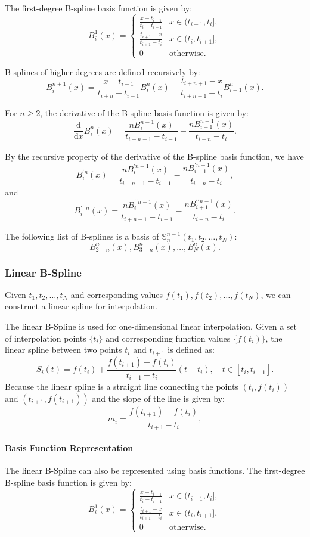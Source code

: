 \documentclass[a4paper]{article}
\begin{document}
\begin{sloppypar}
The first-degree B-spline basis function is given by:
\[ B^1_i(x) = \begin{cases}
\frac{x - t_{i-1}}{t_i - t_{i-1}} & x \in (t_{i-1}, t_i], \\
\frac{t_{i+1} - x}{t_{i+1} - t_i} & x \in (t_i, t_{i+1}], \\
0 & \text{otherwise.}
\end{cases} \]

B-splines of higher degrees are defined recursively by:
\[ B_{i}^{n+1}(x) = \frac{x - t_{i-1}}{t_{i+n} - t_{i-1}} B_{i}^{n}(x) + \frac{t_{i+n+1} - x}{t_{i+n+1} - t_{i}} B_{i+1}^{n}(x). \]


For \( n \geq 2 \), the derivative of the B-spline basis function is given by:
\[ \frac{\mathrm{d}}{\mathrm{d}x} B_{i}^{n}(x) = \frac{n B_{i}^{n-1}(x)}{t_{i+n-1} - t_{i-1}} - \frac{n B_{i+1}^{n-1}(x)}{t_{i+n} - t_{i}}. \]

By the recursive property of the derivative of the B-spline basis function, we have
\[  B_{i}^{\prime n}(x) = \frac{n B_{i}^{\prime n-1}(x)}{t_{i+n-1} - t_{i-1}} - \frac{n B_{i+1}^{\prime n-1}(x)}{t_{i+n} - t_{i}}, \]
and
\[  B_{i}^{\prime \prime \prime n}(x) = \frac{n B_{i}^{\prime \prime n-1}(x)}{t_{i+n-1} - t_{i-1}} - \frac{n B_{i+1}^{\prime \prime n-1}(x)}{t_{i+n} - t_{i}}. \]


The following list of B-splines is a basis of \(\mathbb{S}_{n}^{n-1}(t_{1},t_{2},\ldots,t_{N})\):
\[ B_{2-n}^{n}(x), B_{3-n}^{n}(x), \ldots, B_{N}^{n}(x).  \]

\subsubsection{Linear B-Spline}
Given \( t_1, t_2, \ldots, t_{N} \) and corresponding values \( f(t_1), f(t_2), \ldots, f(t_N) \), we can construct a linear spline for interpolation.

The linear B-Spline is used for one-dimensional linear interpolation. Given a set of interpolation points \(\{t_i\}\) and corresponding function values \(\{f(t_i)\}\), the linear spline between two points \(t_i\) and \(t_{i+1}\) is defined as:
\[ S_i(t) = f(t_i) + \frac{f(t_{i+1}) - f(t_i)}{t_{i+1} - t_i} (t - t_i), \quad t \in [t_i, t_{i+1}]. \]
Because the linear spline is a straight line connecting the points \((t_i, f(t_i))\) and \((t_{i+1}, f(t_{i+1}))\) and the slope of the line is given by:
\[ m_i = \frac{f(t_{i+1}) - f(t_i)}{t_{i+1} - t_i}, \]


\paragraph*{Basis Function Representation}
The linear B-Spline can also be represented using basis functions. The first-degree B-spline basis function is given by:
\[ B^1_i(x) = \begin{cases}
\frac{x - t_{i-1}}{t_i - t_{i-1}} & x \in (t_{i-1}, t_i], \\
\frac{t_{i+1} - x}{t_{i+1} - t_i} & x \in (t_i, t_{i+1}], \\
0 & \text{otherwise.}
\end{cases} \]


\end{sloppypar}
\end{document}
